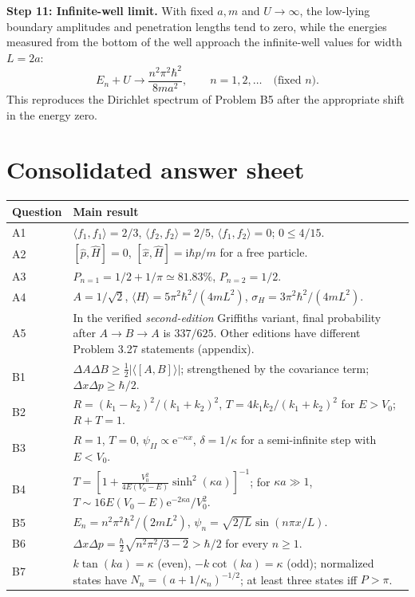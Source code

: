 \documentclass[11pt,a4paper]{article}
\newcommand{\iu}{\mathrm{i}}
\newcommand{\ee}{\mathrm{e}}
\newcommand{\abs}[1]{\left|#1\right|}
\begin{document}
\textbf{Step 11: Infinite-well limit.} With fixed $a,m$ and $U\to\infty$, the low-lying boundary amplitudes and penetration lengths tend to zero, while the energies measured from the bottom of the well approach the infinite-well values for width $L=2a$:
\begin{equation}
E_n+U\longrightarrow\frac{n^2\pi^2\hbar^2}{8ma^2},\qquad n=1,2,\ldots\quad\text{(fixed $n$)}.
\end{equation}
This reproduces the Dirichlet spectrum of Problem B5 after the appropriate shift in the energy zero.

\section{Consolidated answer sheet}
\begin{longtable}{@{}p{.11\linewidth}p{.81\linewidth}@{}}\toprule
Question & Main result \\\midrule\endhead
A1 & $\langle f_1,f_1\rangle=2/3$, $\langle f_2,f_2\rangle=2/5$, $\langle f_1,f_2\rangle=0$; $0\leq4/15$.\\
A2 & $[\hat p,\hat H]=0$, $[\hat x,\hat H]=\iu\hbar\hat p/m$ for a free particle.\\
A3 & $P_{n=1}=1/2+1/\pi\simeq81.83\%$, $P_{n=2}=1/2$.\\
A4 & $A=1/\sqrt2$, $\langle H\rangle=5\pi^2\hbar^2/(4mL^2)$, $\sigma_H=3\pi^2\hbar^2/(4mL^2)$.\\
A5 & In the verified \emph{second-edition} Griffiths variant, final probability after $A\!\to\!B\!\to\!A$ is $337/625$. Other editions have different Problem 3.27 statements (appendix).\\
B1 & $\Delta A\Delta B\geq\frac12\abs{\langle[A,B]\rangle}$; strengthened by the covariance term; $\Delta x\Delta p\geq\hbar/2$.\\
B2 & $R=(k_1-k_2)^2/(k_1+k_2)^2$, $T=4k_1k_2/(k_1+k_2)^2$ for $E>V_0$; $R+T=1$.\\
B3 & $R=1$, $T=0$, $\psi_{II}\propto\ee^{-\kappa x}$, $\delta=1/\kappa$ for a semi-infinite step with $E<V_0$.\\
B4 & $T=\left[1+\frac{V_0^2}{4E(V_0-E)}\sinh^2(\kappa a)\right]^{-1}$; for $\kappa a\gg1$, $T\sim16E(V_0-E)\ee^{-2\kappa a}/V_0^2$.\\
B5 & $E_n=n^2\pi^2\hbar^2/(2mL^2)$, $\psi_n=\sqrt{2/L}\sin(n\pi x/L)$.\\
B6 & $\Delta x\Delta p=\frac\hbar2\sqrt{n^2\pi^2/3-2}>\hbar/2$ for every $n\geq1$.\\
B7 & $k\tan(ka)=\kappa$ (even), $-k\cot(ka)=\kappa$ (odd); normalized states have $N_n=(a+1/\kappa_n)^{-1/2}$; at least three states iff $P>\pi$.\\\bottomrule
\end{longtable}
\end{document}
